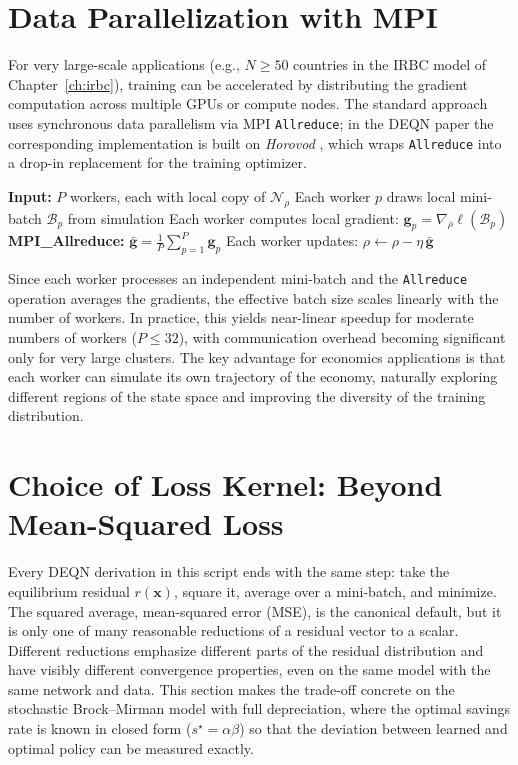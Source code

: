 \documentclass[11pt,a4paper]{report}
\begin{document}
\section{Data Parallelization with MPI}

For very large-scale applications (e.g., $N \geq 50$ countries in the IRBC model of Chapter~\ref{ch:irbc}), training can be accelerated by distributing the gradient computation across multiple GPUs or compute nodes.  The standard approach uses synchronous data parallelism via MPI \texttt{Allreduce}; in the DEQN paper the corresponding implementation is built on \textit{Horovod} \citep{sergeev2018horovod}, which wraps \texttt{Allreduce} into a drop-in replacement for the training optimizer.

\begin{definitionbox}
\begin{algorithmic}
\small
\STATE \textbf{Input:} $P$ workers, each with local copy of $\mathcal{N}_\rho$
    \STATE Each worker $p$ draws local mini-batch $\mathcal{B}_p$ from simulation
    \STATE Each worker computes local gradient: $\bm{g}_p = \nabla_\rho \ell(\mathcal{B}_p)$
    \STATE \textbf{MPI\_Allreduce:} $\bar{\bm{g}} = \frac{1}{P}\sum_{p=1}^P \bm{g}_p$
    \STATE Each worker updates: $\rho \leftarrow \rho - \eta\,\bar{\bm{g}}$
\ENDFOR
\end{algorithmic}
\end{definitionbox}

Since each worker processes an independent mini-batch and the \texttt{Allreduce} operation averages the gradients, the effective batch size scales linearly with the number of workers.  In practice, this yields near-linear speedup for moderate numbers of workers ($P \leq 32$), with communication overhead becoming significant only for very large clusters.  The key advantage for economics applications is that each worker can simulate its own trajectory of the economy, naturally exploring different regions of the state space and improving the diversity of the training distribution.

\section{Choice of Loss Kernel: Beyond Mean-Squared Loss}
\label{sec:loss_kernels}

Every DEQN derivation in this script ends with the same step: take the equilibrium residual $r(\bm{x})$, square it, average over a mini-batch, and minimize.  The squared average, mean-squared error (MSE), is the canonical default, but it is only one of many reasonable reductions of a residual vector to a scalar.  Different reductions emphasize different parts of the residual distribution and have visibly different convergence properties, even on the same model with the same network and data.  This section makes the trade-off concrete on the stochastic Brock--Mirman model with full depreciation, where the optimal savings rate is known in closed form ($s^\star = \alpha\beta$) so that the deviation between learned and optimal policy can be measured exactly.
\end{document}
